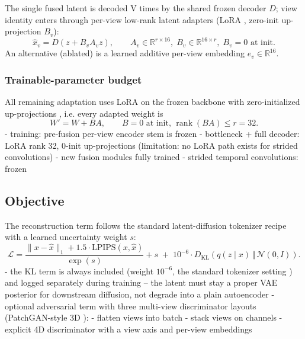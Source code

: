 The single fused latent is decoded V times by the shared frozen decoder $D$; view identity enters through per-view low-rank latent adapters (LoRA \cite{hu2022lora}, zero-init up-projection $B_v$):
\begin{equation}
\hat{x}_v = D\!\left(z + B_v A_v z\right),
\qquad
A_v \in \mathbb{R}^{r \times 16},\; B_v \in \mathbb{R}^{16 \times r},\; B_v = 0 \text{ at init.}
\label{eq:view_decode}
\end{equation}
An alternative (ablated) is a learned additive per-view embedding $e_v \in \mathbb{R}^{16}$.

\subsubsection{Trainable-parameter budget}

All remaining adaptation uses LoRA \cite{hu2022lora} on the frozen backbone with zero-initialized up-projections \cite{zhang2023adding}, i.e. every adapted weight is
\begin{equation}
W' = W + B A, \qquad B = 0 \text{ at init, } \operatorname{rank}(BA) \le r = 32.
\label{eq:lora}
\end{equation}
- training: pre-fusion per-view encoder stem is frozen
- bottleneck + full decoder: LoRA rank 32, 0-init up-projections (limitation: no LoRA path exists for strided convolutions)
- new fusion modules fully trained
- strided temporal convolutions: frozen

\subsection{Objective}

The reconstruction term follows the standard latent-diffusion tokenizer recipe \cite{rombach2022high, zheng2024opensora} with a learned uncertainty weight $s$:
\begin{equation}
\mathcal{L} =
\frac{\lVert x - \hat{x} \rVert_1 + 1.5 \cdot \mathrm{LPIPS}(x, \hat{x})}{\exp(s)} + s
\;+\; 10^{-6} \cdot D_{\mathrm{KL}}\!\left(q(z \mid x) \,\Vert\, \mathcal{N}(0, I)\right).
\label{eq:objective}
\end{equation}
- the KL term is always included (weight $10^{-6}$, the standard tokenizer setting \cite{rombach2022high}) and logged separately during training -- the latent must stay a proper VAE posterior for downstream diffusion, not degrade into a plain autoencoder
- optional adversarial term with three multi-view discriminator layouts (PatchGAN-style 3D \cite{isola2017image}):
    - flatten views into batch
    - stack views on channels
    - explicit 4D discriminator with a view axis and per-view embeddings

